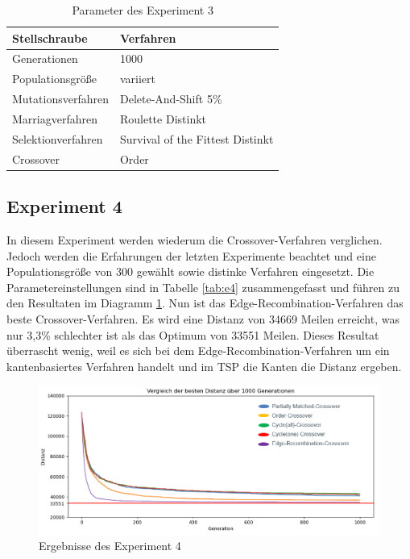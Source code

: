 \begin{table}[H]
\centering
\caption{Parameter des Experiment 3}
\begin{tabular}{ll}
Stellschraube & Verfahren \\
\hline
Generationen & 1000 \\
Populationsgröße & variiert \\
Mutationsverfahren & Delete-And-Shift 5\% \\
Marriagverfahren & Roulette Distinkt \\
Selektionverfahren & Survival of the Fittest Distinkt \\
Crossover & Order
\end{tabular}
\label{tab:e3}
\end{table}

\subsection{Experiment 4}
In diesem Experiment werden wiederum die Crossover-Verfahren verglichen. Jedoch werden die Erfahrungen der letzten Experimente beachtet und eine Populationsgröße von 300 gewählt sowie distinke Verfahren eingesetzt.
Die Parametereinstellungen sind in Tabelle \ref{tab:e4} zusammengefasst und führen zu den Resultaten im Diagramm \ref{fig:experiment4}. Nun ist das Edge-Recombination-Verfahren das beste Crossover-Verfahren. Es wird eine Distanz von 34669 Meilen erreicht, was nur 3,3\% schlechter ist als das Optimum von 33551 Meilen. Dieses Resultat überrascht wenig, weil es sich bei dem Edge-Recombination-Verfahren um ein kantenbasiertes Verfahren handelt und im TSP die Kanten die Distanz ergeben.

\begin{figure}[H]
\centering
\includegraphics[width=1\textwidth]{img/Vortrag/experiment4.png}
\caption{Ergebnisse des Experiment 4}
\label{fig:experiment4}
\end{figure}

